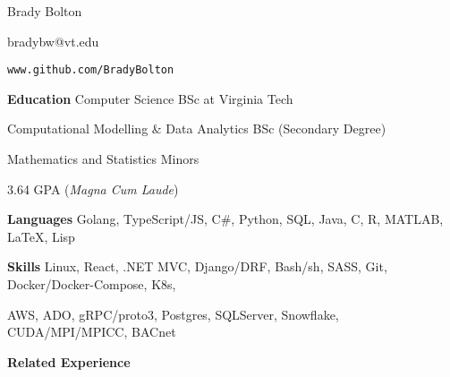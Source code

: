 \documentclass{article}
\newcommand{\code}[1]{\texttt{#1}} %
\begin{document}
	\begin{center}
	
		\huge{Brady Bolton}
		
		\large{bradybw@vt.edu}

		\large{\code{www.github.com/BradyBolton}}


	\end{center}

\vline


\textbf{\large{Education}} \quad Computer Science BSc at Virginia Tech

\qquad \qquad \qquad \hspace{10pt} Computational Modelling \& Data Analytics BSc (Secondary Degree)

\qquad \qquad \qquad \hspace{10pt} Mathematics and Statistics Minors

\qquad \qquad \qquad \hspace{10pt} 3.64 GPA (\textit{Magna Cum Laude})

\vline

\textbf{\large{Languages}} \quad Golang, TypeScript/JS, C\#, Python, SQL, Java, C, R, MATLAB, \LaTeX, Lisp

\textbf{\large{Skills}} \qquad \qquad Linux, React, .NET MVC, Django/DRF, Bash/sh, SASS, Git, Docker/Docker-Compose, K8s,

\qquad \qquad \qquad \hspace{10pt}  AWS, ADO, gRPC/proto3, Postgres, SQLServer, Snowflake, CUDA/MPI/MPICC,  BACnet %

\vline

\textbf{\large{Related Experience}} 

\vspace{5pt}
\end{document}
